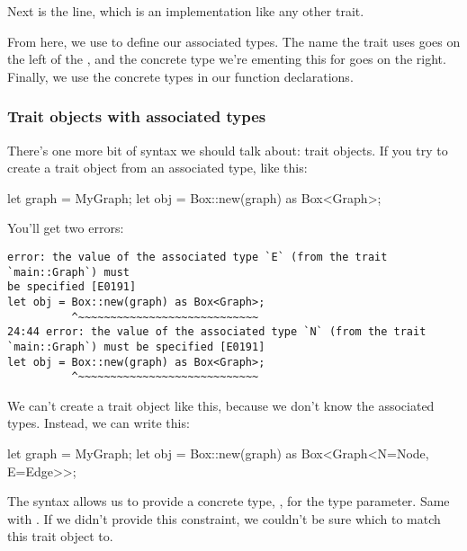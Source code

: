 \blank

Next is the  line, which is an implementation like any other trait.

\blank

From here, we use \code{=} to define our associated types. The name the trait uses goes on the left of the \code{=}, and the concrete 
type we're ementing this for goes on the right. Finally, we use the concrete types in our function declarations.

\subsubsection*{Trait objects with associated types}

There's one more bit of syntax we should talk about: trait objects. If you try to create a trait object from an associated type, like this:

\begin{rustc}
let graph = MyGraph;
let obj = Box::new(graph) as Box<Graph>;
\end{rustc}

You'll get two errors:

\begin{verbatim}
error: the value of the associated type `E` (from the trait `main::Graph`) must
be specified [E0191]
let obj = Box::new(graph) as Box<Graph>;
          ^~~~~~~~~~~~~~~~~~~~~~~~~~~~~
24:44 error: the value of the associated type `N` (from the trait
`main::Graph`) must be specified [E0191]
let obj = Box::new(graph) as Box<Graph>;
          ^~~~~~~~~~~~~~~~~~~~~~~~~~~~~
\end{verbatim}

We can't create a trait object like this, because we don't know the associated types. Instead, we can write this:

\begin{rustc}
let graph = MyGraph;
let obj = Box::new(graph) as Box<Graph<N=Node, E=Edge>>;
\end{rustc}

The  syntax allows us to provide a concrete type, , for the  type parameter. Same with . 
If we didn't provide this constraint, we couldn't be sure which  to match this trait object to.
